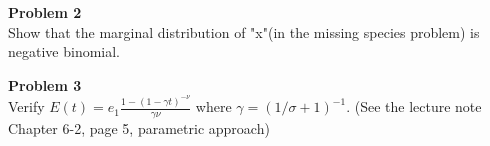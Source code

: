 \documentclass{article}
\theoremstyle{definition}
\theoremstyle{definition}
\theoremstyle{remark}
\newenvironment{problem}[2][Problem]
    { \begin{mdframed}[backgroundcolor=gray!20] \textbf{#1 #2} \\}
    {  \end{mdframed}}
\begin{document}
    \begin{problem}{2}
        Show that the marginal distribution of "x"(in the missing species problem) is negative binomial.
    \end{problem}
    
    \begin{problem}{3}
        Verify $E(t) = e_1\frac{1-(1- \gamma t)^{-\nu}}{\gamma \nu}$ where $\gamma = (1/\sigma + 1)^{-1}$. (See the lecture note Chapter 6-2, page 5, parametric approach)    
    \end{problem}
\end{document}
